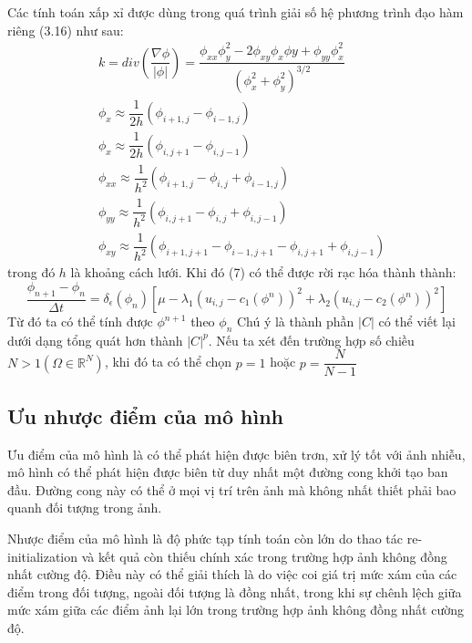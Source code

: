 \documentclass[14pt,oneside,a4paper]{extreport}
\begin{document}
Các tính toán xấp xỉ được dùng trong quá trình giải số hệ phương trình đạo hàm riêng (3.16) như sau:
\begin{equation}
\begin{split}
&k=div(\dfrac{\nabla \phi}{|\phi|})=\dfrac{\phi_{xx}\phi^2_{y}-2\phi_{xy}\phi_{x}\phi{y}+\phi_{yy}\phi^2_{x}}{(\phi^2_x+\phi^2_y)^{3/2}}\\
&\phi_x\approx \dfrac{1}{2h}(\phi_{i+1,j}-\phi_{i-1,j}) \\ 
&\phi_x\approx \dfrac{1}{2h}(\phi_{i,j+1}-\phi_{i,j-1}) \\
&\phi_{xx}\approx \dfrac{1}{h^2}(\phi_{i+1,j}-\phi_{i,j}+\phi_{i-1,j}) \\
&\phi_{yy}\approx \dfrac{1}{h^2}(\phi_{i,j+1}-\phi_{i,j}+\phi_{i,j-1}) \\
&\phi_{xy}\approx \dfrac{1}{h^2}(\phi_{i+1,j+1}-\phi_{i-1,j+1}-\phi_{i,j+1}+\phi_{i,j-1}) 
\end{split}
\end{equation}
trong đó $h$ là khoảng cách lưới. Khi đó (7) có thể được rời rạc hóa thành thành: 
\begin{equation}
\dfrac{\phi_{n+1}-\phi_{n}}{\Delta t}=\delta_{\epsilon}(\phi_{n})[\mu -\lambda_1 (u_{i,j}-c_1(\phi^{n}))^2+\lambda_2 (u_{i,j}-c_2(\phi^{n}))^2]
\end{equation}
Từ đó ta có thể tính được $\phi^{n+1}$ theo $\phi_{n}$
Chú ý là thành phần $|C|$ có thể viết lại dưới dạng tổng quát hơn thành $|C|^p$. Nếu ta xét đến trường hợp số chiều $N>1(\Omega \in \mathbb{R}^N )$, khi đó ta có thể chọn $p=1$ hoặc $p=\dfrac{N}{N-1}$
\subsection{Ưu nhược điểm của mô hình}
\hspace{0.5cm}Ưu điểm của mô hình là có thể phát hiện được biên trơn, xử lý tốt với ảnh nhiễu, mô hình có thể phát hiện được biên từ duy nhất một đường cong khởi tạo ban đầu. Đường cong này có thể ở mọi vị trí trên ảnh mà không nhất thiết phải bao quanh đối tượng trong ảnh.

Nhược điểm của mô hình  là độ phức tạp tính toán còn lớn do thao tác re-initialization và kết quả còn thiếu chính xác trong trường hợp ảnh không đồng nhất cường độ. Điều này có thể giải thích là do việc coi giá trị mức xám của các điểm trong đối tượng, ngoài đối tượng là đồng nhất, trong khi sự chênh lệch giữa mức xám giữa các điểm ảnh lại lớn trong trường hợp ảnh không đồng nhất cường độ.
\end{document}
